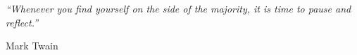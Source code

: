 \documentclass[12pt, letterpaper, twoside,spanish, openright]{usach-tesis}
\begin{document}
 \pdfstringdefDisableCommands{%
   \let\MakeUppercase\relax
} 





\frontmatter


\clearpage  %

\pagestyle{empty}  %

\null\vfill
\textit{``Whenever you find yourself on the side of the majority, it is time to pause and reflect.''}

\begin{flushright}
Mark Twain
\end{flushright}

\vfill\vfill\vfill\vfill\vfill\vfill\null
\clearpage  %

\pagestyle{empty}
\clearpage  %


\pagestyle{empty}  %


\tableofcontents  %

\listoffigures  %

\listoftables  %
\end{document}
